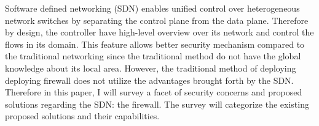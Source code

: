Software defined networking (SDN) enables unified control over heterogeneous network switches by separating the control plane from the data plane.
Therefore by design, the controller have high-level overview over its network and control the flows in its domain.
This feature allows better security mechanism compared to the traditional networking since the traditional method do not have the global knowledge about its local area.
However, the traditional method of deploying deploying firewall does not utilize the advantages brought forth by the SDN.
Therefore in this paper, I will survey a facet of security concerns and proposed solutions regarding the SDN: the firewall.
The survey will categorize the existing proposed solutions and their capabilities.
